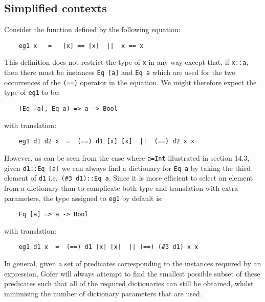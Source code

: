\subsection{Simplified contexts}
Consider the function defined by the following equation:
\begin{verbatim}
    eg1 x   =   [x] == [x]  ||  x == x
\end{verbatim}
This definition does not restrict the type of \verb"x" in any way except that,
if \verb"x::a", then there must be instances \verb"Eq [a]" 
and \verb"Eq a" which are  used
for the two occurrences of the \verb"(==)" operator in the equation.  We might
therefore expect the type of \verb"eg1" to be:
\begin{verbatim}
    (Eq [a], Eq a) => a -> Bool
\end{verbatim}
with translation:
\begin{verbatim}
    eg1 d1 d2 x  =  (==) d1 [x] [x]  ||  (==) d2 x x
\end{verbatim}
However, as can be seen  from  the  case  where  \verb"a=Int"  illustrated  in
section 14.3, given \verb"d1::Eq [a]" 
we can always find a dictionary for \verb"Eq a"
by taking the third element of \verb"d1" i.e.\ 
\verb"(#3 d1)::Eq a".  Since it is more
efficient to select an element from a  dictionary  than  to  complicate
both type and translation with extra parameters, the type  assigned  to
\verb"eg1" by default is:
\begin{verbatim}
    Eq [a] => a -> Bool
\end{verbatim}
with translation:
\begin{verbatim}
    eg1 d1 x  =  (==) d1 [x] [x]  || (==) (#3 d1) x x
\end{verbatim}
In general, given a set of predicates corresponding  to  the  instances
required by an expression,  Gofer  will  always  attempt  to  find  the
smallest possible subset of these  predicates  such  that  all  of  the
required dictionaries can still  be  obtained,  whilst  minimising  the
number of dictionary parameters that are used.

